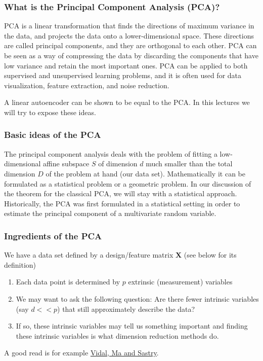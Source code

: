 \documentclass{beamer}
\begin{document}
\begin{frame}
\frametitle{What is the Principal Component Analysis (PCA)?}

PCA is a linear transformation that finds the directions of maximum
variance in the data, and projects the data onto a lower-dimensional
space. These directions are called principal components, and they are
orthogonal to each other. PCA can be seen as a way of compressing the
data by discarding the components that have low variance and retain
the most important ones. PCA can be applied to both supervised and
unsupervised learning problems, and it is often used for data
visualization, feature extraction, and noise reduction.

A linear autoencoder can be shown to be equal to the PCA.
In this lectures we will try to expose these ideas.
\end{frame}

\begin{frame}
\frametitle{Basic ideas of the PCA}

The principal component analysis deals with the problem of fitting a
low-dimensional affine subspace $S$ of dimension $d$ much smaller than
the total dimension $D$ of the problem at hand (our data
set). Mathematically it can be formulated as a statistical problem or
a geometric problem.  In our discussion of the theorem for the
classical PCA, we will stay with a statistical approach. 
Historically, the PCA was first formulated in a statistical setting in order to estimate the principal component of a multivariate random variable.
\end{frame}

\begin{frame}
\frametitle{Ingredients of the PCA}

We have a data set defined by a design/feature matrix $\bm{X}$ (see below for its definition) 
\begin{enumerate}
\item Each data point is determined by $p$ extrinsic (measurement) variables

\item We may want to ask the following question: Are there fewer intrinsic variables (say $d << p$) that still approximately describe the data?

\item If so, these intrinsic variables may tell us something important and finding these intrinsic variables is what dimension reduction methods do. 
\end{enumerate}

\noindent
A good read is for example \href{{https://www.springer.com/gp/book/9780387878102}}{Vidal, Ma and Sastry}.
\end{frame}
\end{document}
